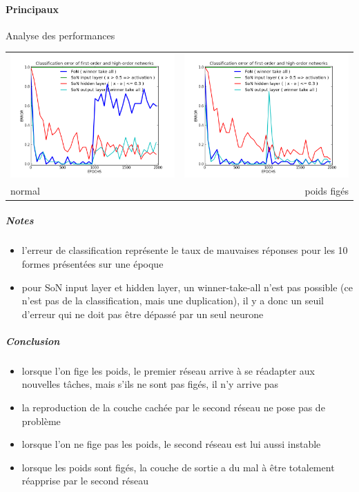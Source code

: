     \paragraph{Principaux}
      Analyse des performances
      \begin{center}
	\begin{tabular}{lr}
	  \hspace*{-1cm}
	  \includegraphics[width=250px]{data/expB5/err.png}
	  &
	  \includegraphics[width=250px]{data/expB5/err_block.png} \\
	  normal
	  &
	  poids figés
	\end{tabular}
      \end{center}
      \subparagraph{Notes}
	\begin{itemize}
	  \item l'erreur de classification représente le taux de mauvaises réponses pour les 10 formes présentées sur une époque
	  \item pour SoN input layer et hidden layer, un winner-take-all n'est pas possible (ce n'est pas de la classification, 
	  mais une duplication), il y a donc un seuil d'erreur qui ne doit pas être dépassé par un seul neurone
	\end{itemize}
      \subparagraph{Conclusion}
	\begin{itemize}
	  \item lorsque l'on fige les poids, le premier réseau arrive à se réadapter aux nouvelles tâches, mais s'ils ne sont
	  pas figés, il n'y arrive pas
	  \item la reproduction de la couche cachée par le second réseau ne pose pas de problème
	  \item lorsque l'on ne fige pas les poids, le second réseau est lui aussi instable
	  \item lorsque les poids sont figés, la couche de sortie a du mal à être totalement réapprise par le second réseau
	  
	\end{itemize}
